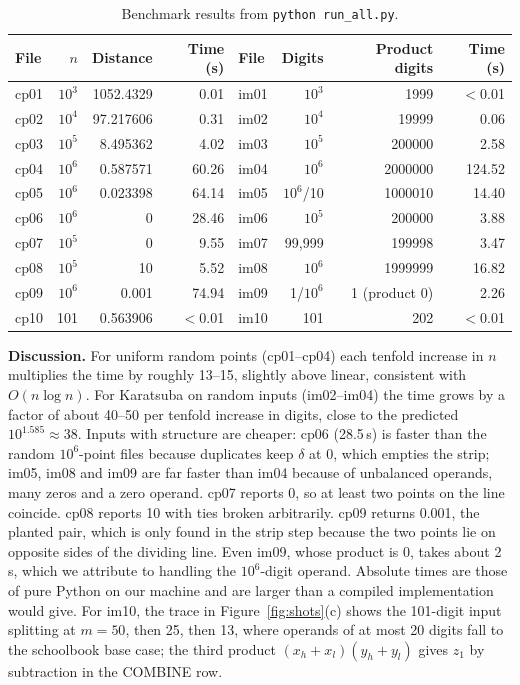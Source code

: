 \documentclass[10pt,a4paper]{article}
\begin{document}
\begin{table}[h]
\centering\small
\caption{Benchmark results from \texttt{python run\_all.py}.}\label{tab:res}
\begin{tabular}{@{}l r r r | l r r r@{}}
\toprule
File & $n$ & Distance & Time (s) & File & Digits & Product digits & Time (s)\\
\midrule
cp01 & $10^3$ & 1052.4329 & 0.01 & im01 & $10^3$ & 1999 & $<$0.01\\
cp02 & $10^4$ & 97.217606 & 0.31 & im02 & $10^4$ & 19999 & 0.06\\
cp03 & $10^5$ & 8.495362 & 4.02 & im03 & $10^5$ & 200000 & 2.58\\
cp04 & $10^6$ & 0.587571 & 60.26 & im04 & $10^6$ & 2000000 & 124.52\\
cp05 & $10^6$ & 0.023398 & 64.14 & im05 & $10^6$/10 & 1000010 & 14.40\\
cp06 & $10^6$ & 0 & 28.46 & im06 & $10^5$ & 200000 & 3.88\\
cp07 & $10^5$ & 0 & 9.55 & im07 & 99{,}999 & 199998 & 3.47\\
cp08 & $10^5$ & 10 & 5.52 & im08 & $10^6$ & 1999999 & 16.82\\
cp09 & $10^6$ & 0.001 & 74.94 & im09 & 1/$10^6$ & 1 (product 0) & 2.26\\
cp10 & 101 & 0.563906 & $<$0.01 & im10 & 101 & 202 & $<$0.01\\
\bottomrule
\end{tabular}
\end{table}

\textbf{Discussion.} For uniform random points (cp01--cp04) each tenfold increase in $n$ multiplies the time by roughly 13--15, slightly above linear, consistent with $O(n\log n)$. For Karatsuba on random inputs (im02--im04) the time grows by a factor of about 40--50 per tenfold increase in digits, close to the predicted $10^{1.585}\approx 38$. Inputs with structure are cheaper: cp06 (28.5\,s) is faster than the random $10^6$-point files because duplicates keep $\delta$ at 0, which empties the strip; im05, im08 and im09 are far faster than im04 because of unbalanced operands, many zeros and a zero operand. cp07 reports 0, so at least two points on the line coincide. cp08 reports 10 with ties broken arbitrarily. cp09 returns 0.001, the planted pair, which is only found in the strip step because the two points lie on opposite sides of the dividing line. Even im09, whose product is 0, takes about 2\,s, which we attribute to handling the $10^6$-digit operand. Absolute times are those of pure Python on our machine and are larger than a compiled implementation would give. For im10, the trace in Figure~\ref{fig:shots}(c) shows the 101-digit input splitting at $m=50$, then 25, then 13, where operands of at most 20 digits fall to the schoolbook base case; the third product $(x_h+x_l)(y_h+y_l)$ gives $z_1$ by subtraction in the COMBINE row.
\end{document}
